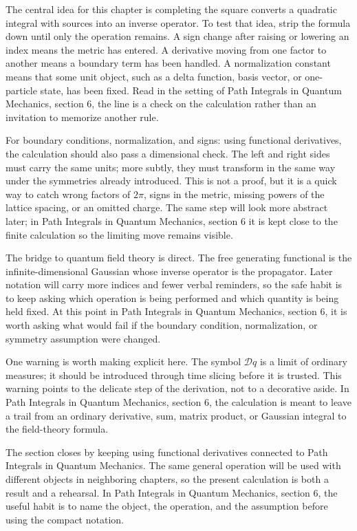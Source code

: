 The central idea for this chapter is completing the square converts a quadratic integral with sources into an inverse operator.  To test that idea, strip the formula down until only the operation remains.  A sign change after raising or lowering an index means the metric has entered.  A derivative moving from one factor to another means a boundary term has been handled.  A normalization constant means that some unit object, such as a delta function, basis vector, or one-particle state, has been fixed.  Read in the setting of Path Integrals in Quantum Mechanics, section 6, the line is a check on the calculation rather than an invitation to memorize another rule.

For boundary conditions, normalization, and signs: using functional derivatives, the calculation should also pass a dimensional check.  The left and right sides must carry the same units; more subtly, they must transform in the same way under the symmetries already introduced.  This is not a proof, but it is a quick way to catch wrong factors of \(2\pi\), signs in the metric, missing powers of the lattice spacing, or an omitted charge.  The same step will look more abstract later; in Path Integrals in Quantum Mechanics, section 6 it is kept close to the finite calculation so the limiting move remains visible.

The bridge to quantum field theory is direct.  The free generating functional is the infinite-dimensional Gaussian whose inverse operator is the propagator.  Later notation will carry more indices and fewer verbal reminders, so the safe habit is to keep asking which operation is being performed and which quantity is being held fixed.  At this point in Path Integrals in Quantum Mechanics, section 6, it is worth asking what would fail if the boundary condition, normalization, or symmetry assumption were changed.

One warning is worth making explicit here.  The symbol \(\mathcal D q\) is a limit of ordinary measures; it should be introduced through time slicing before it is trusted.  This warning points to the delicate step of the derivation, not to a decorative aside.  In Path Integrals in Quantum Mechanics, section 6, the calculation is meant to leave a trail from an ordinary derivative, sum, matrix product, or Gaussian integral to the field-theory formula.

The section closes by keeping using functional derivatives connected to Path Integrals in Quantum Mechanics.  The same general operation will be used with different objects in neighboring chapters, so the present calculation is both a result and a rehearsal.  In Path Integrals in Quantum Mechanics, section 6, the useful habit is to name the object, the operation, and the assumption before using the compact notation.



